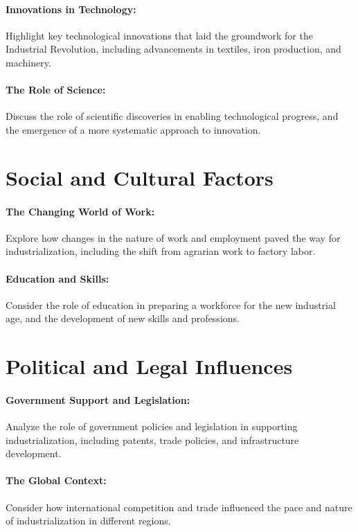\documentclass[a4paper,12pt]{book}
\begin{document}
\paragraph{Innovations in Technology:}
Highlight key technological innovations that laid the groundwork for the Industrial Revolution, including advancements in textiles, iron production, and machinery.

\paragraph{The Role of Science:}
Discuss the role of scientific discoveries in enabling technological progress, and the emergence of a more systematic approach to innovation.

\section*{Social and Cultural Factors}

\paragraph{The Changing World of Work:}
Explore how changes in the nature of work and employment paved the way for industrialization, including the shift from agrarian work to factory labor.

\paragraph{Education and Skills:}
Consider the role of education in preparing a workforce for the new industrial age, and the development of new skills and professions.

\section*{Political and Legal Influences}

\paragraph{Government Support and Legislation:}
Analyze the role of government policies and legislation in supporting industrialization, including patents, trade policies, and infrastructure development.

\paragraph{The Global Context:}
Consider how international competition and trade influenced the pace and nature of industrialization in different regions.
\end{document}

